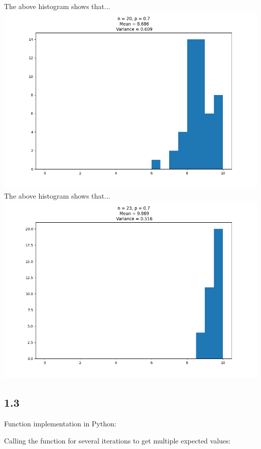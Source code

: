 \documentclass[answers]{exam}
\begin{document}
The above histogram shows that...\\
\includegraphics[scale = 0.5]{Q1_histograms/Q1.2 _n = 20_p = 0.7.png}\\
The above histogram shows that...\\
\includegraphics[scale = 0.5]{Q1_histograms/Q1.2 _n = 23_p = 0.7.png}

\pagebreak
\subsection*{1.3}
Function implementation in Python:

Calling the function for several iterations to get multiple expected values:

\end{document}
